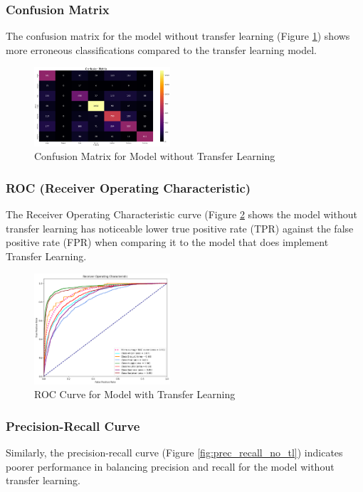 \documentclass[conference]{IEEEtran}
\begin{document}
\subsubsection{Confusion Matrix}
The confusion matrix for the model without transfer learning (Figure \ref{fig:confmat_no_tl}) shows more erroneous classifications compared to the transfer learning model.

\begin{figure}[H]
    \centering
    \includegraphics[width=0.45\textwidth]{Figures/Confusion matrix - no TL.png}
    \caption{Confusion Matrix for Model without Transfer Learning}
    \label{fig:confmat_no_tl}
\end{figure}

\subsubsection{ROC (Receiver Operating Characteristic)}
The Receiver Operating Characteristic curve (Figure \ref{fig:roc_notl} shows the model without transfer learning has noticeable lower true positive rate (TPR) against the false positive rate (FPR) when comparing it to the model that does implement Transfer Learning.

\begin{figure}[H]
    \centering
    \includegraphics[width=0.45\textwidth]{Figures/ROC - no TL.png}
    \caption{ROC Curve for Model with Transfer Learning}
    \label{fig:roc_notl}
\end{figure}
\subsubsection{Precision-Recall Curve}
Similarly, the precision-recall curve (Figure \ref{fig:prec_recall_no_tl}) indicates poorer performance in balancing precision and recall for the model without transfer learning.
\end{document}
